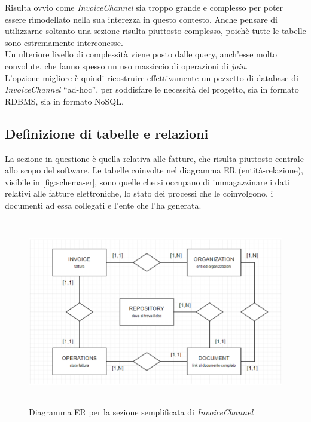 \noindent Risulta ovvio come \textit{InvoiceChannel} sia troppo grande e complesso per poter essere rimodellato nella sua interezza in questo contesto. Anche pensare di utilizzarne soltanto una sezione risulta piuttosto complesso, poichè tutte le tabelle sono estremamente interconesse.\\
Un ulteriore livello di complessità viene posto dalle query, anch'esse molto convolute, che fanno spesso un uso massiccio di operazioni di \textit{join}.\\
L'opzione migliore è quindi ricostruire effettivamente un pezzetto di database di \textit{InvoiceChannel} ``ad-hoc'', per soddisfare le necessità del progetto, sia in formato RDBMS, sia in formato NoSQL.\\

\subsection{Definizione di tabelle e relazioni}
La sezione in questione è quella relativa alle fatture, che risulta piuttosto centrale allo scopo del software. Le tabelle coinvolte nel diagramma ER (entità-relazione), visibile in \autoref{fig:schema-er}, sono quelle che si occupano di immagazzinare i dati relativi alle fatture elettroniche, lo stato dei processi che le coinvolgono, i documenti ad essa collegati e l'ente che l'ha generata.\\

\begin{figure}[htbp]
\begin{center}
\includegraphics[height=22em]{immagini/ER-Mock-IC.png}
\caption{Diagramma ER per la sezione semplificata di \textit{InvoiceChannel}}
\label{fig:schema-er}
\end{center}
\end{figure}

